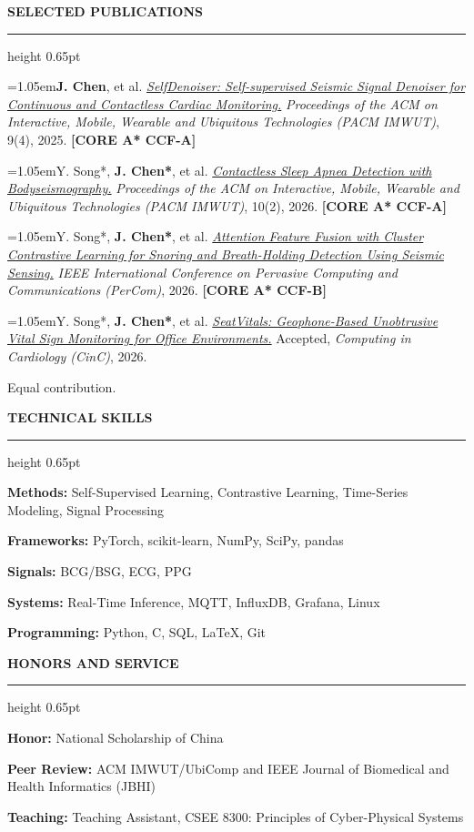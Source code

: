 \documentclass[10pt,letterpaper]{article}
\newcommand{\sectiontitle}[1]{%
  \vspace{0.72em}%
  {\fontsize{12}{13.3}\selectfont\bfseries\color{accent}\MakeUppercase{#1}}\par
  \vspace{0.16em}%
  {\color{accent}\hrule height 0.65pt}%
  \vspace{0.38em}%
}
\newcommand{\publication}[1]{%
  {\fontsize{9.45}{11.05}\selectfont\hangindent=1.05em\hangafter=1\textbullet\hspace{0.42em}#1\par}%
  \vspace{0.11em}%
}
\begin{document}
\sectiontitle{Selected Publications}
\publication{\textbf{J. Chen}, et al. \href{https://doi.org/10.1145/3770701}{\textit{SelfDenoiser: Self-supervised Seismic Signal Denoiser for Continuous and Contactless Cardiac Monitoring.}} \textit{Proceedings of the ACM on Interactive, Mobile, Wearable and Ubiquitous Technologies (PACM IMWUT)}, 9(4), 2025. \textbf{[CORE A* \textbar{} CCF-A]}}
\publication{Y. Song*, \textbf{J. Chen*}, et al. \href{https://doi.org/10.1145/3810211}{\textit{Contactless Sleep Apnea Detection with Bodyseismography.}} \textit{Proceedings of the ACM on Interactive, Mobile, Wearable and Ubiquitous Technologies (PACM IMWUT)}, 10(2), 2026. \textbf{[CORE A* \textbar{} CCF-A]}}
\publication{Y. Song*, \textbf{J. Chen*}, et al. \href{https://doi.org/10.1109/PerCom67906.2026.11524561}{\textit{Attention Feature Fusion with Cluster Contrastive Learning for Snoring and Breath-Holding Detection Using Seismic Sensing.}} \textit{IEEE International Conference on Pervasive Computing and Communications (PerCom)}, 2026. \textbf{[CORE A* \textbar{} CCF-B]}}
\publication{Y. Song*, \textbf{J. Chen*}, et al. \href{https://cinc.org/2026/Program/accepted/285.html}{\textit{SeatVitals: Geophone-Based Unobtrusive Vital Sign Monitoring for Office Environments.}} Accepted, \textit{Computing in Cardiology (CinC)}, 2026.}
{\fontsize{9.1}{10.4}\selectfont * Equal contribution.}\par

\sectiontitle{Technical Skills}
{\fontsize{9.7}{11.3}\selectfont
  \textbf{Methods:} Self-Supervised Learning, Contrastive Learning, Time-Series Modeling, Signal Processing\par
  \textbf{Frameworks:} PyTorch, scikit-learn, NumPy, SciPy, pandas\par
  \textbf{Signals:} BCG/BSG, ECG, PPG\par
  \textbf{Systems:} Real-Time Inference, MQTT, InfluxDB, Grafana, Linux\par
  \textbf{Programming:} Python, C, SQL, LaTeX, Git\par
}

\sectiontitle{Honors and Service}
{\fontsize{9.7}{11.3}\selectfont
  \textbf{Honor:} National Scholarship of China\par
  \textbf{Peer Review:} ACM IMWUT/UbiComp and IEEE Journal of Biomedical and Health Informatics (JBHI)\par
  \textbf{Teaching:} Teaching Assistant, CSEE 8300: Principles of Cyber-Physical Systems\par
}
\end{document}
